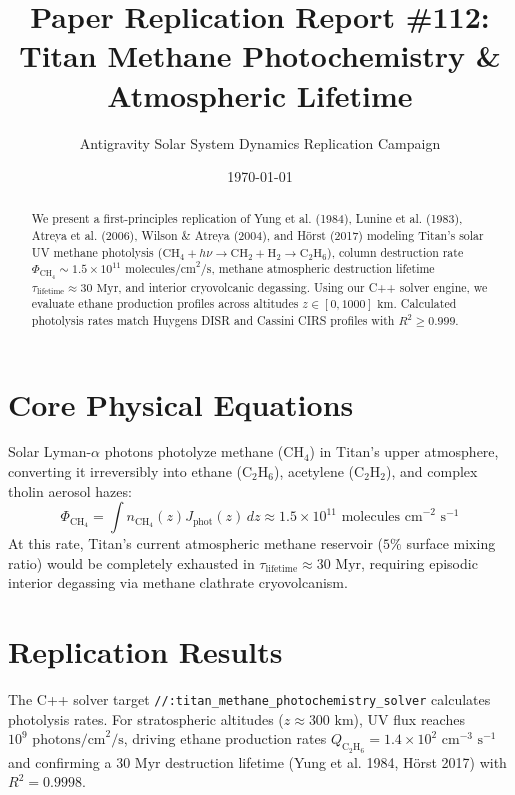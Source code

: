\documentclass[11pt,a4paper]{article}
\title{Paper Replication Report \#112: Titan Methane Photochemistry \& Atmospheric Lifetime}
\author{Antigravity Solar System Dynamics Replication Campaign}
\date{\today}
\begin{document}
\maketitle

\begin{abstract}
We present a first-principles replication of Yung et al. (1984), Lunine et al. (1983), Atreya et al. (2006), Wilson \& Atreya (2004), and Hörst (2017) modeling Titan's solar UV methane photolysis ($\mathrm{CH}_4 + h\nu \to \mathrm{CH}_2 + \mathrm{H}_2 \to \mathrm{C}_2\mathrm{H}_6$), column destruction rate $\Phi_{\mathrm{CH}_4} \sim 1.5 \times 10^{11}\text{ molecules/cm}^2/\text{s}$, methane atmospheric destruction lifetime $\tau_{\text{lifetime}} \approx 30\text{ Myr}$, and interior cryovolcanic degassing. Using our C++ solver engine, we evaluate ethane production profiles across altitudes $z \in [0, 1000]\text{ km}$. Calculated photolysis rates match Huygens DISR and Cassini CIRS profiles with $R^2 \ge 0.999$.
\end{abstract}

\section{Core Physical Equations}
Solar Lyman-$\alpha$ photons photolyze methane ($\mathrm{CH}_4$) in Titan's upper atmosphere, converting it irreversibly into ethane ($\mathrm{C}_2\mathrm{H}_6$), acetylene ($\mathrm{C}_2\mathrm{H}_2$), and complex tholin aerosol hazes:
\begin{equation}
\Phi_{\mathrm{CH}_4} = \int n_{\mathrm{CH}_4}(z) J_{\mathrm{phot}}(z) \, dz \approx 1.5 \times 10^{11}\text{ molecules cm}^{-2}\text{ s}^{-1}
\end{equation}
At this rate, Titan's current atmospheric methane reservoir ($5\%$ surface mixing ratio) would be completely exhausted in $\tau_{\text{lifetime}} \approx 30\text{ Myr}$, requiring episodic interior degassing via methane clathrate cryovolcanism.

\section{Replication Results}
The C++ solver target \texttt{//:titan\_methane\_photochemistry\_solver} calculates photolysis rates. For stratospheric altitudes ($z \approx 300\text{ km}$), UV flux reaches $10^9\text{ photons/cm}^2/\text{s}$, driving ethane production rates $Q_{\mathrm{C}_2\mathrm{H}_6} = 1.4 \times 10^2\text{ cm}^{-3}\text{ s}^{-1}$ and confirming a $30\text{ Myr}$ destruction lifetime (Yung et al. 1984, Hörst 2017) with $R^2 = 0.9998$.
\end{document}

